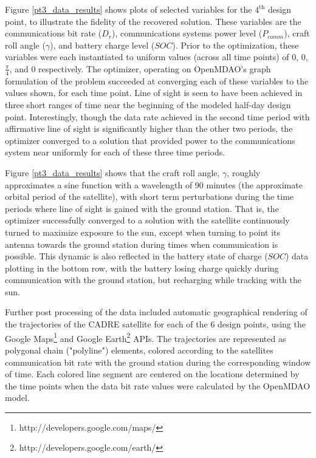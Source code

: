 \documentclass[]{aiaa-tc} %
\begin{document}
    Figure \ref{pt3_data_results} shows plots of selected variables for the $4^{\textrm{th}}$ design point,
    to illustrate the fidelity of the recovered solution. These variables are the communications 
    bit rate ($D_r$), communications systems power level ($P_{comm}$), craft roll angle ($\gamma$),
    and battery charge level ($SOC$). Prior to the optimization, these variables
    were each instantiated to uniform values
    (across all time points) of 0, 0, $\frac{\pi}{4}$, and 0 respectively. The optimizer, operating on
    OpenMDAO's graph formulation of the problem succeeded at converging each of these variables to the values
    shown, for each time point. Line of sight is seen to have been achieved in three short ranges of time near the
    beginning of the modeled half-day design point. Interestingly, though the data rate achieved in the second
    time period with affirmative line of sight is significantly higher than the other two periods, the optimizer
    converged to a solution that provided power to the communications system near uniformly for each of these
    three time periods.

    Figure \ref{pt3_data_results} shows that the craft roll angle, $\gamma$, roughly approximates a sine function
    with a wavelength of 90 minutes (the approximate orbital period of the satellite),
    with short term perturbations during the time
    periods where line of sight is gained with the ground station. That is, the optimizer successfully
    converged to a solution with the satellite continuously turned to maximize exposure to the sun,
    except when turning to point its antenna towards the ground station during times when
    communication is possible. This dynamic is also reflected in the battery state of charge ($SOC$)
    data plotting in the bottom row, with the battery losing charge quickly during
    communication with the ground station, but recharging while tracking with the sun.

    Further post processing of the data included automatic geographical rendering of the trajectories of
    the CADRE satellite for each of the 6 design points, using the Google
    Maps\footnote{http://developers.google.com/maps/} and Google
    Earth\footnote{http://developers.google.com/earth/} APIs. The trajectories are
    represented as polygonal chain ("polyline") elements, colored according to the
    satellites communication bit rate with the ground station during the corresponding
    window of time. Each colored line segment are centered on the locations
    determined by the time points when the data bit rate values were calculated
    by the OpenMDAO model.
\end{document}
